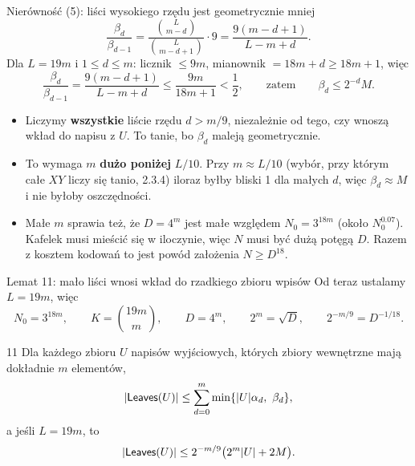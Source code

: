 \begin{frame}{Nierówność (5): liści wysokiego rzędu jest geometrycznie mniej}
  \[
    \frac{\beta_d}{\beta_{d-1}}
    =\frac{\binom{L}{m-d}}{\binom{L}{m-d+1}}\cdot9
    =\frac{9(m-d+1)}{L-m+d}.
  \]
  \pause
  Dla $L=19m$ i $1\le d\le m$: licznik $\le9m$, mianownik $=18m+d\ge18m+1$, więc
  \[
    \frac{\beta_d}{\beta_{d-1}}=\frac{9(m-d+1)}{L-m+d}\le\frac{9m}{18m+1}<\frac12,
    \qquad\text{zatem}\qquad \beta_d\le2^{-d}M.\tag{5}
  \]
  \pause
  \begin{itemize}
    \item Liczymy \textbf{wszystkie} liście rzędu $d>m/9$, niezależnie od tego, czy wnoszą wkład do napisu z $U$.
      To tanie, bo $\beta_d$ maleją geometrycznie.
    \item<4-> To wymaga $m$ \textbf{dużo poniżej} $L/10$. Przy $m\approx L/10$ (wybór, przy którym całe $XY$ liczy się tanio, 2.3.4)
      iloraz byłby bliski 1 dla małych $d$, więc $\beta_d\approx M$ i nie byłoby oszczędności.
    \item<5-> Małe $m$ sprawia też, że $D=4^m$ jest małe względem $N_0=3^{18m}$ (około $N_0^{0.07}$). Kafelek musi mieścić się w iloczynie,
      więc $N$ musi być dużą potęgą $D$. Razem z kosztem kodowań to jest powód założenia \alert{$N\ge D^{18}$}.
  \end{itemize}
\end{frame}

\begin{frame}{Lemat 11: mało liści wnosi wkład do rzadkiego zbioru wpisów}
  Od teraz ustalamy $L=19m$, więc
  \[
    N_0=3^{18m},\qquad K=\binom{19m}{m},\qquad D=4^m,\qquad 2^m=\sqrt D,\qquad 2^{-m/9}=D^{-1/18}.
  \]
  \begin{lemat}{11}
    Dla każdego zbioru $U$ napisów wyjściowych, których zbiory wewnętrzne mają dokładnie $m$ elementów,
    \[
      |\Leaves(U)|\le\sum_{d=0}^{m}\min\{|U|\alpha_d,\ \beta_d\},
    \]
    a jeśli $L=19m$, to
    \[
      |\mathsf{Leaves}(U)|\le2^{-m/9}\big(2^m|U|+2M\big).
    \]
  \end{lemat}
\end{frame}

